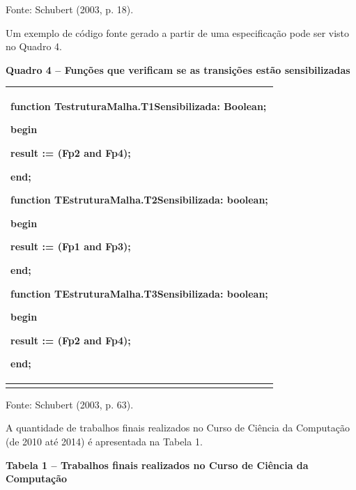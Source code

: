 Fonte: Schubert (2003, p. 18).

Um exemplo de código fonte gerado a partir de uma especificação pode ser
visto no Quadro 4.

\begin{center}\textbf{Quadro 4 -- Funções que verificam se as transições estão sensibilizadas}\end{center}

\begin{longtable}[]{@{}
  >{\raggedright\arraybackslash}p{}@{}}
\toprule\noalign{}
\begin{minipage}[b]{\linewidth}\raggedright
function TestruturaMalha.T1Sensibilizada: Boolean;

begin

result := (Fp2 and Fp4);

end;

function TEstruturaMalha.T2Sensibilizada: boolean;

begin

result := (Fp1 and Fp3);

end;

function TEstruturaMalha.T3Sensibilizada: boolean;

begin

result := (Fp2 and Fp4);

end;
\end{minipage} \\
\midrule\noalign{}
\endhead
\bottomrule\noalign{}
\endlastfoot
\end{longtable}

Fonte: Schubert (2003, p. 63).

A quantidade de trabalhos finais realizados no Curso de Ciência da
Computação (de 2010 até 2014) é apresentada na Tabela 1.

\begin{center}\textbf{Tabela 1 -- Trabalhos finais realizados no Curso de Ciência da Computação}\end{center}

